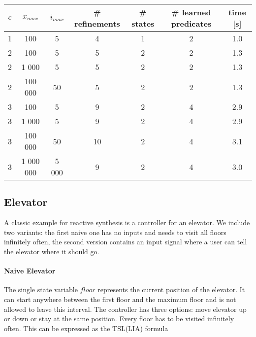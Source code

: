 \documentclass[runningheads]{llncs}
\begin{document}
\begin{center}
\begin{tabular}{ |c|c|c|c|c|c|c| } 
\hline
$c$ & $x_{max}$ & $i_{max}$ & \# refinements & \# states & \# learned predicates & time [s]\\
\hline
1 & 100 & 5 & 4 & 1 & 2 & 1.0 \\
2 & 100 & 5 & 5 & 2 & 2 & 1.3 \\ 
2 & 1 000 & 5 & 5 & 2 & 2 & 1.3 \\ 
2 & 100 000 & 50 & 5 & 2 & 2 & 1.3 \\ 
3 & 100 & 5 & 9 & 2 & 4 & 2.9 \\ 
3 & 1 000 & 5 & 9 & 2 & 4 & 2.9 \\ 
3 & 100 000 & 50 & 10 & 2 & 4 & 3.1 \\ 
3 & 1 000 000 & 5 000 & 9 & 2 & 4 & 3.0 \\ 
\hline
\end{tabular}
\end{center}


\subsection{Elevator}
A classic example for reactive synthesis is a controller for an elevator.
We include two variants: the first naive one has no inputs and needs to visit all floors infinitely often, the second version contains an input signal where a user can tell the elevator where it should go.

\paragraph{Naive Elevator} The single state variable $floor$ represents the current position of the elevator.
It can start anywhere between the first floor and the maximum floor and is not allowed to leave this interval.
The controller has three options: move elevator up or down or stay at the same position.
Every floor has to be visited infinitely often. This can be expressed as the TSL(LIA) formula
\end{document}
